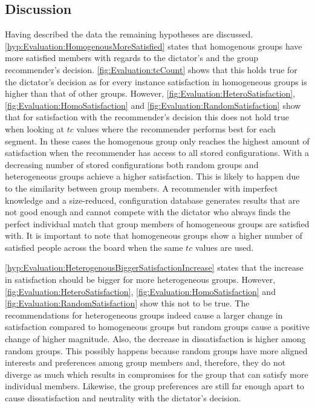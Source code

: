 \subsection{Discussion}

Having described the data the remaining hypotheses are discussed.
\autoref{hyp:Evaluation:HomogenousMoreSatisfied} states that homogenous groups have more satisfied members with regards to the dictator's and the group recommender's decision. \autoref{fig:Evaluation:tcCount} shows that this holds true for the dictator's decision as for every instance satisfaction in homogeneous groups is higher than that of other groups. However, \autoref{fig:Evaluation:HeteroSatisfaction}, \autoref{fig:Evaluation:HomoSatisfaction} and \autoref{fig:Evaluation:RandomSatisfaction} show that for satisfaction with the recommender's decision this does not hold true when looking at $tc$ values where the recommender performs best for each segment. In these cases the homogenous group only reaches the highest amount of satisfaction when the recommender has access to all stored configurations. With a decreasing number of stored configurations both random groups and heterogeneous groups achieve a higher satisfaction. This is likely to happen due to the similarity between group members. A recommender with imperfect knowledge and a size-reduced, configuration database generates results that are not good enough and cannot compete with the dictator who always finds the perfect individual match that group members of homogeneous groups are satisfied with. It is important to note that homogeneous groups show a higher number of satisfied people across the board when the same $tc$ values are used.

\autoref{hyp:Evaluation:HeterogenousBiggerSatisfactionIncrease} states that the increase in satisfaction should be bigger for more heterogeneous groups. However, \autoref{fig:Evaluation:HeteroSatisfaction}, \autoref{fig:Evaluation:HomoSatisfaction} and \autoref{fig:Evaluation:RandomSatisfaction} show this not to be true. The recommendations for heterogeneous groups indeed cause a larger change in satisfaction compared to homogeneous groups but random groups cause a positive change of higher magnitude. Also, the decrease in dissatisfaction is higher among random groups. This possibly happens because random groups have more aligned interests and preferences among group members and, therefore, they do not diverge as much which results in compromises for the group that can satisfy more individual members. Likewise, the group preferences are still far enough apart to cause dissatisfaction and neutrality with the dictator's decision.

